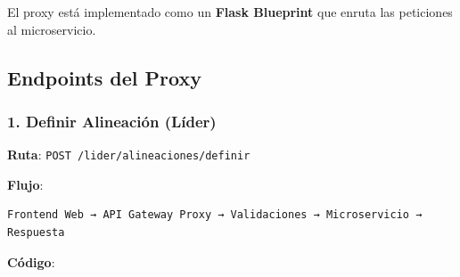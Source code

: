 \documentclass[
  spanish,
  11pt,
  letterpaper,
]{book}
\begin{document}
El proxy está implementado como un \textbf{Flask Blueprint} que enruta
las peticiones al microservicio.

\subsection{Endpoints del Proxy}\label{endpoints-del-proxy}

\subsubsection{1. Definir Alineación
(Líder)}\label{definir-alineaciuxf3n-luxedder}

\textbf{Ruta}: \texttt{POST\ /lider/alineaciones/definir}

\textbf{Flujo}:

\begin{verbatim}
Frontend Web → API Gateway Proxy → Validaciones → Microservicio → Respuesta
\end{verbatim}

\textbf{Código}:
\end{document}
